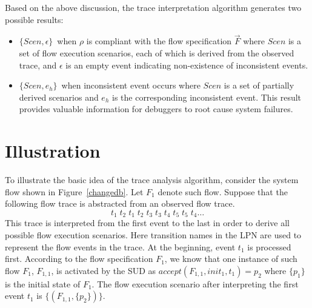 \documentclass[12pt,frontmatter,copyright,thesis]{usfmanus}
\begin{document}
 Based on the above discussion, the trace interpretation
 algorithm generates two possible results:
 \begin{itemize}
 \item $\{Scen,\epsilon\}$\ when $\rho$ is compliant with the flow specification $\vec{F}$
 where
 $Scen$  is a set of
 flow execution scenarios, each of which is derived from the observed trace,
 and $\epsilon$ is an empty event indicating non-existence of inconsistent events.
 \item  $\{Scen, e_h\}$\ when inconsistent event occurs
 where
 $Scen$ is a set of partially derived scenarios and
 $e_h$ is the corresponding inconsistent event.
 This result provides valuable
 information for debuggers to root cause system failures.
 \end{itemize}
 
 

\section{Illustration}
To illustrate the basic idea of the trace analysis algorithm,
consider the system flow shown in 
Figure~\ref{changedb}. Let $F_1$ denote such flow.
Suppose that the following flow trace is abstracted from an
observed flow trace.
\begin{equation}
\label{eq:1}
	t_1\;t_2\;t_1\;t_2\;t_3\;t_3\;t_4\;t_5\;t_5\;t_4\ldots
\end{equation} 
This trace is interpreted from the first event to the last in order to derive all possible flow execution
 scenarios.
Here transition names in the LPN are used to represent the 
flow events in the trace.  
At the beginning, event $t_1$ is processed first. 
According to the flow specification $F_1$, 
we know that one instance of such flow $F_1$, $F_{1,1}$, is activated by the SUD 
as $\mathit{accept}(F_{1,1}, init_1, t_1) = p_2$ where $\{p_1\}$ is the initial state of $F_1$. 
The flow execution scenario after interpreting the first event $\mathit{t_1}$ is $\{(F_{1,1}, \{p_2\})\}$.  
\end{document}
